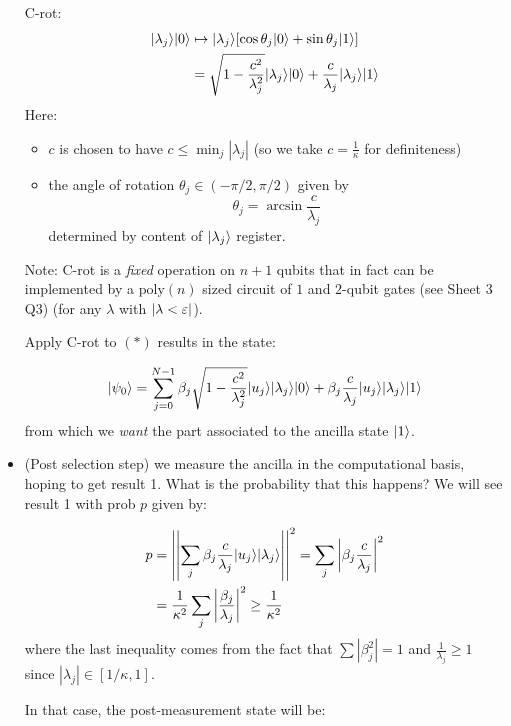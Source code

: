 \documentclass[]{article}
\renewcommand{\it}[1]{\textit{#1}}
\newcommand{\poly}{\textrm{poly}}
\begin{document}
\begin{remark*}
\begin{itemize}
		C-rot:
		\begin{align*}
			\lvert\lambda_j\rangle\lvert0\rangle & \mapsto \lvert\lambda_j\rangle [\cos \theta_j \lvert0\rangle + \sin\theta_j \lvert1\rangle]\\
			&= \sqrt{1 - \frac{c^2}{\lambda_j^2}}\lvert\lambda_j\rangle\lvert0\rangle + \frac{c}{\lambda_j}\lvert\lambda_j\rangle\lvert1\rangle
		\end{align*}
		Here:
		\begin{itemize}
			\item $c$ is chosen to have $c\le \min_j |\lambda_j|$ (so we take $c = \frac{1}{\kappa}$ for definiteness)
			\item the angle of rotation $\theta_j \in (-\pi/2,\pi/2)$ given by $$\theta_j = \arcsin \frac{c}{\lambda_j}$$ determined by content of $\lvert\lambda_j\rangle$ register.
		\end{itemize}
		Note: C-rot is a \it{fixed} operation on $n+1$ qubits that in fact can be implemented by a $\poly(n)$ sized circuit of $1$ and $2$-qubit gates (see Sheet 3 Q3) (for any $\lambda$ with $|\lambda < \varepsilon|$).

		Apply C-rot to $(\ast)$ results in the state:

		\begin{align*}
			\lvert\psi_0\rangle = \sum_{j=0}^{N-1}\beta_j\sqrt{1 - \frac{c^2}{\lambda_j^2}} \lvert u_j\rangle\lvert\lambda_j\rangle\lvert0\rangle + \beta_j \frac{c}{\lambda_j}\lvert u_j\rangle\lvert\lambda_j\rangle\lvert1\rangle
		\end{align*}
		from which we \it{want} the part associated to the ancilla state $\lvert1\rangle$.

		\item (Post selection step) we measure the ancilla in the computational basis, hoping to get result 1. What is the probability that this happens? We will see result 1 with prob $p$ given by:
		
		\begin{align*}
			p &= \left| \left| \sum_{j}\beta_j \frac{c}{\lambda_j}\lvert u_j\rangle\lvert\lambda_j\rangle\right|\right|^2 = \sum_{j}\left|\beta_j\frac{c}{\lambda_j}\right|^2\\
			&= \frac{1}{\kappa^2}\sum_j \left| \frac{\beta_j}{\lambda_j}\right|^2 \ge \frac{1}{\kappa^2}
		\end{align*}
		where the last inequality comes from the fact that $\sum |\beta_j^2| = 1$ and $\frac{1}{\lambda_j} \ge 1$ since $|\lambda_j| \in [1/\kappa,1]$.

		In that case, the post-measurement state will be:


\end{itemize}
\end{remark*}
\end{document}
